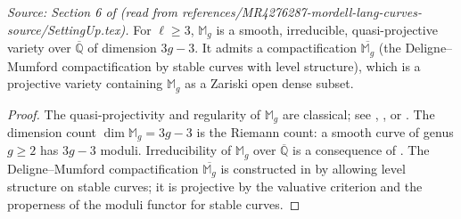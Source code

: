 \begin{proposition}
  \label{prop:Mg_quasiprojective}
  \textit{Source: Section 6 of \cite{MR4276287-mordell-lang-curves} (read from references/MR4276287-mordell-lang-curves-source/SettingUp.tex).}
  For \(\ell \ge 3\), \(\mathbb{M}_g\) is a smooth, irreducible, quasi-projective variety over
  \(\overline{\mathbb{Q}}\) of dimension \(3g - 3\). It admits a compactification
  \(\overline{\mathbb{M}_g}\) (the Deligne--Mumford compactification by stable curves with
  level structure), which is a projective variety containing \(\mathbb{M}_g\) as a Zariski
  open dense subset.
\end{proposition}

\begin{proof}
  The quasi-projectivity and regularity of \(\mathbb{M}_g\) are classical; see
  \cite[Chapter~XVI, Theorem~2.11]{ACG:Curve}, \cite[(5.14)]{DM:irreducibility}, or
  \cite[Theorem~1.8]{OortSteenbrink}. The dimension count \(\dim \mathbb{M}_g = 3g - 3\)
  is the Riemann count: a smooth curve of genus \(g \ge 2\) has \(3g - 3\) moduli.
  Irreducibility of \(\mathbb{M}_g\) over \(\overline{\mathbb{Q}}\) is a consequence of
  \cite[Theorem~5.15]{DM:irreducibility}. The Deligne--Mumford compactification
  \(\overline{\mathbb{M}_g}\) is constructed in \cite[Theorem~5.2]{DM:irreducibility} by
  allowing level structure on stable curves; it is projective by the valuative criterion and
  the properness of the moduli functor for stable curves.
\end{proof}


